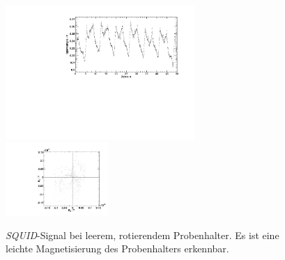 \begin{figure}[H]
\begin{center}
  \includegraphics[width=0.64\textwidth]{../img/emptyHolder.pdf}
  \includegraphics[width=0.35\textwidth]{../img/polar_emptyHolder.pdf}
  \caption{\emph{SQUID}-Signal bei leerem, rotierendem Probenhalter. Es ist eine leichte Magnetisierung des
  Probenhalters erkennbar.}
  \label{img:holder}
\end{center}
\end{figure}





